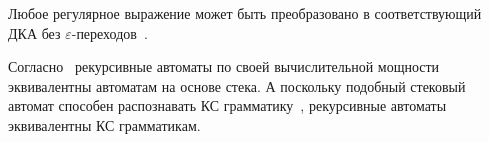 \documentclass[14pt]{matmex-diploma-custom}
\begin{document}
Любое регулярное выражение может быть преобразовано в соответствующий ДКА без $\varepsilon$-переходов~\cite{book:automata_theory}. 

Согласно~\cite{article:recursive_state_machines} рекурсивные автоматы по своей вычислительной мощности эквивалентны автоматам на основе стека. А поскольку подобный стековый автомат способен распознавать КС грамматику~\cite{book:automata_theory}, рекурсивные автоматы эквивалентны КС грамматикам.





\setmonofont[Mapping=tex-text]{CMU Typewriter Text}


\end{document}

